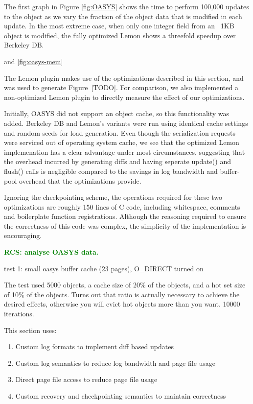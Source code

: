 \documentclass[letterpaper,twocolumn,english]{article}
\newcommand{\yad}{Lemon\xspace}
\newcommand{\rcs}[1]{\textcolor{green}{\bf RCS: #1}}
\begin{document}
The first graph in Figure \ref{fig:OASYS} shows the time to perform
100,000 updates to the object as we vary the fraction of the object
data that is modified in each update. In the most extreme case, when
only one integer field from an ~1KB object is modified, the fully
optimized \yad shows a threefold speedup over Berkeley DB.

and \ref{fig:oasys-mem} 

The \yad plugin makes use of the optimizations
described in this section, and was used to generate Figure~[TODO].
For comparison, we also implemented a non-optimized \yad plugin to
directly measure the effect of our optimizations.

Initially, OASYS did not support an object cache, so this
functionality was added.  Berkeley DB and \yad's variants were run
using identical cache settings and random seeds for load generation.
Even though the serialization requests were serviced out of operating
system cache, we see that the optimized \yad implemenation has a
clear advantage under most circumstances, suggesting that the overhead
incurred by generating diffs and having seperate update() and flush()
calls is negligible compared to the savings in log bandwidth and
buffer-pool overhead that the optimizations provide.

Ignoring the checkpointing scheme, the operations required for these
two optimizations are roughly 150 lines of C code, including
whitespace, comments and boilerplate function registrations.  Although
the reasoning required to ensure the correctness of this code was
complex, the simplicity of the implementation is encouraging.

\rcs{analyse OASYS data.}

test 1: small oasys buffer cache (23 pages), O\_DIRECT turned on

The test used 5000 objects, a cache size of 20\% of the objects, and a
hot set size of 10\% of the objects. Turns out that ratio is actually
necessary to achieve the desired effects, otherwise you will evict hot
objects more than you want. 10000 iterations.


This section uses:

\begin{enumerate}
\item{Custom log formats to implement diff based updates}
\item{Custom log semantics to reduce log bandwidth and page file usage}
\item{Direct page file access to reduce page file usage}
\item{Custom recovery and checkpointing semantics to maintain correctness}
\end{enumerate}
\end{document}
